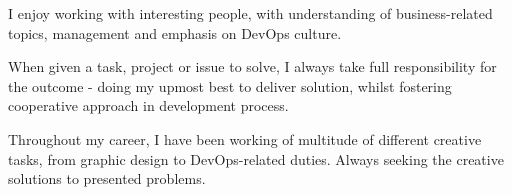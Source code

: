 \documentclass[9pt]{style/developercv}
\begin{document}
\vspace{1cm}


\begin{minipage}[t]{0.3\textwidth}
	\vspace{-\baselineskip}


	I enjoy working with interesting people, with understanding of business-related topics, management and emphasis 
	on DevOps culture.
\end{minipage}
\hfill
\begin{minipage}[t]{0.3\textwidth}
	\vspace{-\baselineskip}
	
	
	When given a task, project or issue to solve, I always take full responsibility for the outcome - doing my upmost
	best to deliver solution, whilst fostering cooperative approach in development process.
\end{minipage}
\hfill
\begin{minipage}[t]{0.3\textwidth}
	\vspace{-\baselineskip}
	
	
	Throughout my career, I have been working of multitude of different creative tasks, from graphic design to DevOps-related duties.
	Always seeking the creative solutions to presented problems. 
\end{minipage}

\vspace{0.75cm}


\end{document}
